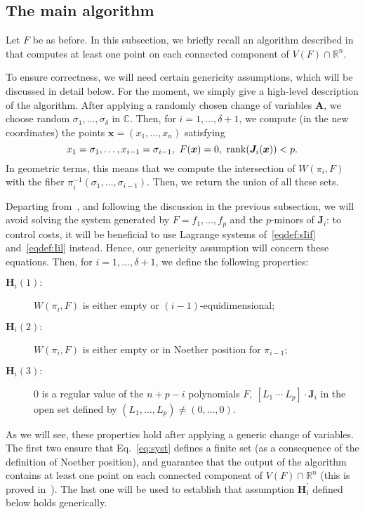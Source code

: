 \documentclass[12pt]{article}
\def\mA{{\bm A}}
\def\xb{{\bm x}}
\def\C{\mathbb{C}}
\def\R{\mathbb{R}}
\begin{document}

\subsection{The main algorithm}

Let $F$ be as before. In this subsection, we briefly recall an
algorithm described in~\cite{EMP} that computes at least one point on
each connected component of $V(F) \cap \R^n$. 

To ensure correctness, we will need certain genericity assumptions,
which will be discussed in detail below. For the moment, we simply
give a high-level description of the algorithm. After applying a
randomly chosen change of variables $\mA$, we choose random
$\sigma_1,\dots,\sigma_{\delta}$ in $\C$. Then, for
$i=1,\dots,\delta+1$, we compute (in the new coordinates) the
points $\xb=(x_1,\dots,x_n)$ satisfying
\begin{equation}\label{eq:syst}
x_1 = \sigma_1,\hdots,x_{i-1} = \sigma_{i-1},\ F(\xb)=0,\ {\rm rank} (\bm J_i(\xb)) < p.
\end{equation}
In geometric terms, this means that we compute the intersection of
$W(\pi_i,F)$ with the fiber $\pi_i^{-1}(\sigma_1,\dots,\sigma_{i-1})$.
Then, we return the union of all these sets.

Departing from~\cite{EMP}, and following the discussion in the
previous subsection, we will avoid solving the system generated by
$F=f_1,\dots,f_p$ and the $p$-minors of $\bm J_i$: to control costs,
it will be beneficial to use Lagrange systems of~\eqref{eqdef:sIif}
and~\eqref{eqdef:Iil} instead. Hence, our genericity assumption will
concern these equations. Then, for $i=1,\dots,\delta+1$, we define the 
following properties:
\begin{description}
\item [$\bm H_i(1):$] $W(\pi_i,F)$ is either empty or $(i-1)$-equidimensional;
\item [$\bm H_i(2):$] $W(\pi_i,F)$ is either empty or in Noether position for
  $\pi_{i-1}$;
\item [$\bm H_i(3):$] $0$ is a regular value of the $n+p-i$ polynomials
  $F,\ [L_1~\cdots~L_p]\cdot \bm J_i$ in the open set defined by
  $(L_1,\dots,L_p) \ne (0,\dots,0)$.
\end{description}
As we will see, these properties hold after applying a generic change
of variables. The first two ensure that Eq.~\eqref{eq:syst} defines a
finite set (as a consequence of the definition of Noether position),
and guarantee that the output of the algorithm contains at least one
point on each connected component of $V(F) \cap \R^n$ (this is proved
in~\cite[Theorem~2]{EMP}). The last one will be used to establish that
assumption $\bm H^{'}_i$ defined below holds generically.
\end{document}
